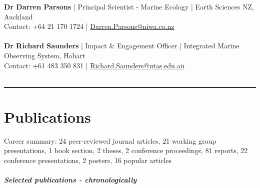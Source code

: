 \documentclass[10pt,a4paper]{article}
\begin{document}
\textbf{Dr Darren Parsons} | Principal Scientist - Marine Ecology | Earth Sciences NZ, Auckland\\
Contact: +64 21 170 1724 | \href{mailto: Darren.Parsons@niwa.co.nz}{Darren.Parsons@niwa.co.nz}\\
\\
\textbf{Dr Richard Saunders} | Impact \& Engagement Officer | Integrated Marine Observing System, Hobart\\
Contact: +61 483 350 831 | \href{mailto:Richard.Saunders@utas.edu.au}{Richard.Saunders@utas.edu.au}\\
\\

\hrule
\newpage
\vspace{6pt}
\noindent
\section*{Publications}

Career summary: 24 peer-reviewed journal articles, 21 working group presentations, 1 book section, 2 theses, 2 conference proceedings, 81 reports, 22 conference presentations, 2 posters, 16 popular articles\\ 
\\
\textit{\textbf{Selected publications - chronologically}}\\
\end{document}

